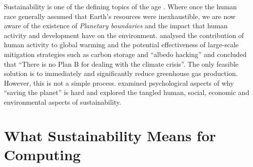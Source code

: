 Sustainability is one of the defining topics of the age \citep{Brundtland1987}. Where once the human race generally assumed that Earth's resources were inexhaustible, we are now aware of the existence of \emph{Planetary boundaries} \citep{Steffen2015} and the impact that human activity and development have on the environment. \citet{Pierrehumbert2019} analysed the contribution of human activity to global warming and the potential effectiveness of large-scale mitigation strategies such as carbon storage and \enquote{albedo hacking} and concluded that \enquote{There is no Plan B for dealing with the climate crisis}. The only feasible solution is to immediately and significantly reduce greenhouse gas production. However, this is not a simple process. \citet{Beattie2010} examined psychological aspects of why \enquote{saving the planet} is hard and \citet{Goodland2002} explored the tangled human, social, economic and environmental aspects of sustainability.

\section{What Sustainability Means for Computing}
\label{literature:computing}

